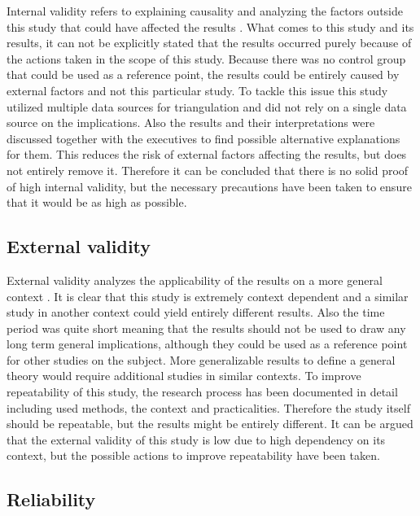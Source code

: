 Internal validity refers to explaining causality and analyzing the factors outside this study that could have affected the results \citep{Runeson2012}. What comes to this study and its results, it can not
be explicitly stated that the results occurred purely because of the actions taken in the scope of this study. Because there was no control group that could be used as a reference point, the results could
be entirely caused by external factors and not this particular study. To tackle this issue this study utilized multiple data sources for triangulation and did not rely on a single data source on the implications.
Also the results and their interpretations were discussed together with the executives to find possible alternative explanations for them.
This reduces the risk of external factors affecting the results, but does not entirely remove it. Therefore it can be concluded that there is no solid proof of high internal validity, but the necessary precautions
have been taken to ensure that it would be as high as possible.

\subsection{External validity}

External validity analyzes the applicability of the results on a more general context \citep{Runeson2012}. It is clear that this study is extremely
context dependent and a similar study in another context could yield entirely different results. Also the time period was quite short meaning that the results should not be used to draw any long term general
implications, although they could be used as a reference point for other studies on the subject. More generalizable results to define a general theory
would require additional studies in similar contexts. To improve repeatability of this
study, the research process has been documented in detail including used methods, the context and practicalities. Therefore the study itself should be repeatable, but the results might be entirely different. 
It can be argued that the external validity of this study is low due to high dependency on its context, but the possible actions to improve repeatability have been taken.

\subsection{Reliability}

